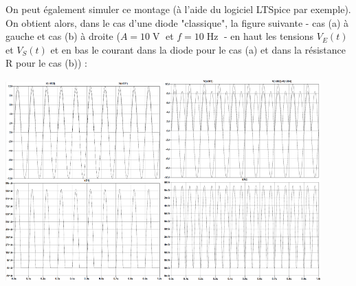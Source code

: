 \documentclass[a4paper,french]{paper}
\begin{document}
On peut également simuler ce montage (à l'aide du logiciel LTSpice par exemple). On obtient alors, dans le cas d'une diode "classique", la figure suivante - cas (a) à gauche et cas (b) à droite ($A = 10\operatorname{V}$ et $f = 10\operatorname{Hz}$ - en haut les tensions $V_E(t)$ et $V_S(t)$ et en bas le courant dans la diode pour le cas (a) et dans la résistance R pour le cas (b)) :

\begin{center}
	\includegraphics[width=6cm]{images/redresseur_001_b_cor.png}\hfill
	\includegraphics[width=6cm]{images/redresseur_001_c_cor.png}
\end{center}	
	
\end{document}
